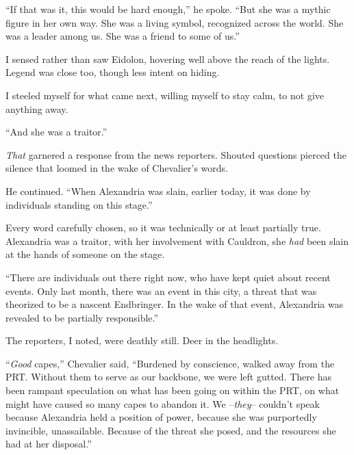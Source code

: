``If that was it, this would be hard enough,'' he spoke.  ``But she was a mythic figure in her own way.  She was a living symbol, recognized across the world.  She was a leader among us.  She was a friend to some of us.''



I sensed rather than saw Eidolon, hovering well above the reach of the lights.  Legend was close too, though less intent on hiding.



I steeled myself for what came next, willing myself to stay calm, to not give anything away.



``And she was a traitor.''



\emph{That} garnered a response from the news reporters.  Shouted questions pierced the silence that loomed in the wake of Chevalier's words.



He continued.  ``When Alexandria was slain, earlier today, it was done by individuals standing on this stage.''



Every word carefully chosen, so it was technically or at least partially true.  Alexandria was a traitor, with her involvement with Cauldron, she \emph{had} been slain at the hands of someone on the stage.



``There are individuals out there right now, who have kept quiet about recent events.  Only last month, there was an event in this city, a threat that was theorized to be a nascent Endbringer.  In the wake of that event, Alexandria was revealed to be partially responsible.''



The reporters, I noted, were deathly still.  Deer in the headlights.



``\emph{Good} capes,'' Chevalier said, ``Burdened by conscience, walked away from the PRT.  Without them to serve as our backbone, we were left gutted.  There has been rampant speculation on what has been going on within the PRT, on what might have caused so many capes to abandon it.  We –\emph{they}– couldn't speak because Alexandria held a position of power, because she was purportedly invincible, unassailable.  Because of the threat she posed, and the resources she had at her disposal.''



